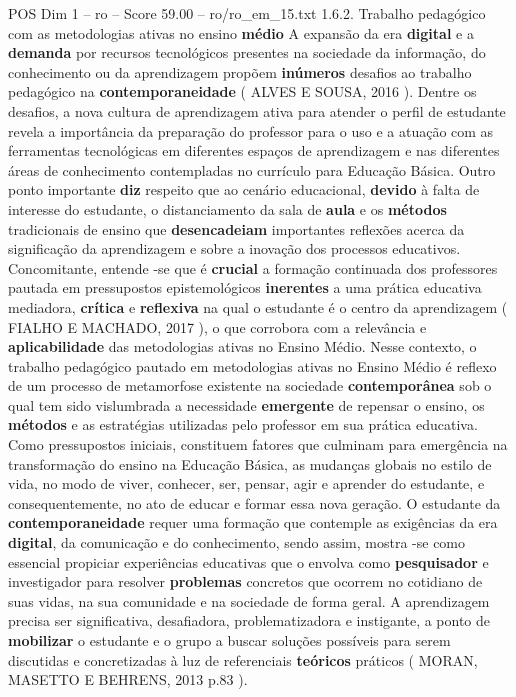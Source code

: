 \begin{textsample}{POS Dim 1 – ro – Score 59.00 – ro/ro\_em\_15.txt}  \label{ex:f1_pos_137}
1.6.2.
Trabalho pedagógico com as metodologias ativas no ensino \textbf{médio} A expansão da era \textbf{digital} e a \textbf{demanda} por recursos tecnológicos presentes na sociedade da informação, do conhecimento ou da aprendizagem propõem \textbf{inúmeros} desafios ao trabalho pedagógico na \textbf{contemporaneidade} ( ALVES E SOUSA, 2016 ).
Dentre os desafios, a nova cultura de aprendizagem ativa para atender o perfil de estudante revela a importância da preparação do professor para o uso e a atuação com as ferramentas tecnológicas em diferentes espaços de aprendizagem e nas diferentes áreas de conhecimento contempladas no currículo para Educação Básica.
Outro ponto importante \textbf{diz} respeito que ao cenário educacional, \textbf{devido} à falta de interesse do estudante, o distanciamento da sala de \textbf{aula} e os \textbf{métodos} tradicionais de ensino que \textbf{desencadeiam} importantes reflexões acerca da significação da aprendizagem e sobre a inovação dos processos educativos.
Concomitante, entende -se que é \textbf{crucial} a formação continuada dos professores pautada em pressupostos epistemológicos \textbf{inerentes} a uma prática educativa mediadora, \textbf{crítica} e \textbf{reflexiva} na qual o estudante é o centro da aprendizagem ( FIALHO E MACHADO, 2017 ), o que corrobora com a relevância e \textbf{aplicabilidade} das metodologias ativas no Ensino Médio.
Nesse contexto, o trabalho pedagógico pautado em metodologias ativas no Ensino Médio é reflexo de um processo de metamorfose existente na sociedade \textbf{contemporânea} sob o qual tem sido vislumbrada a necessidade \textbf{emergente} de repensar o ensino, os \textbf{métodos} e as estratégias utilizadas pelo professor em sua prática educativa.
Como pressupostos iniciais, constituem fatores que culminam para emergência na transformação do ensino na Educação Básica, as mudanças globais no estilo de vida, no modo de viver, conhecer, ser, pensar, agir e aprender do estudante, e consequentemente, no ato de educar e formar essa nova geração.
O estudante da \textbf{contemporaneidade} requer uma formação que contemple as exigências da era \textbf{digital}, da comunicação e do conhecimento, sendo assim, mostra -se como essencial propiciar experiências educativas que o envolva como \textbf{pesquisador} e investigador para resolver \textbf{problemas} concretos que ocorrem no cotidiano de suas vidas, na sua comunidade e na sociedade de forma geral.
A aprendizagem precisa ser significativa, desafiadora, problematizadora e instigante, a ponto de \textbf{mobilizar} o estudante e o grupo a buscar soluções possíveis para serem discutidas e concretizadas à luz de referenciais \textbf{teóricos} práticos ( MORAN, MASETTO E BEHRENS, 2013 p.83 ).

\end{textsample}
